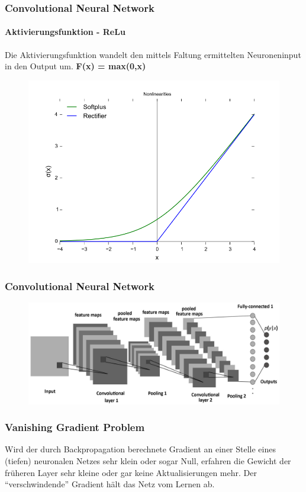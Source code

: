 \documentclass{beamer}
\begin{document}
\begin{frame}
\frametitle{Convolutional Neural Network}
\framesubtitle{Aktivierungsfunktion -  ReLu}
Die Aktivierungsfunktion wandelt den mittels Faltung ermittelten Neuroneninput in den Output um. \textbf{F(x) = max(0,x)}

\begin{figure}
	\centering
	\includegraphics[width=0.7\linewidth]{figures/relu.png}
	\label{img:relu}
\end{figure}
\end{frame}

\begin{frame}
\frametitle{Convolutional Neural Network}
\begin{figure}
	\centering
	\includegraphics[width=\linewidth]{figures/network.png}
	\label{img:maxpooling}
\end{figure}

\end{frame}





\begin{frame}
\frametitle{Vanishing Gradient Problem}

Wird der durch Backpropagation berechnete Gradient an einer Stelle eines (tiefen) neuronalen Netzes sehr klein oder sogar Null, erfahren die Gewicht der früheren Layer sehr kleine oder gar keine Aktualisierungen mehr. Der ``verschwindende'' Gradient hält das Netz vom Lernen ab.
\end{frame}
\end{document}
